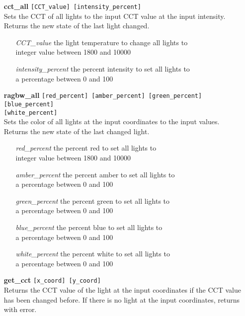 \documentclass[twoside]{article}
\begin{document}
\begin{enumerate}
		\item[\bf cct\_all] \verb|[CCT_value] [intensity_percent]|\\
		Sets the CCT of all lights to the input CCT value at the input intensity.\\
		Returns the new state of the last light changed.
		
		\begin{enumerate}[leftmargin=3\parindent]
			\item[{\it CCT\_value}] the light temperature to change all lights to\\
			integer value between 1800 and 10000
			\item[{\it intensity\_percent}] the percent intensity to set all lights to\\
			a percentage between 0 and 100
		\end{enumerate}
	
		\item[\bf ragbw\_all] \verb|[red_percent] [amber_percent] [green_percent] [blue_percent] |\\
		\verb|[white_percent]|\\
		Sets the color of all lights at the input coordinates to the input values.\\
		Returns the new state of the last changed light.
		
		\begin{enumerate}[leftmargin=3\parindent]
			\item[{\it red\_percent}] the percent red to set all lights to\\
			integer value between 1800 and 10000
			\item[{\it amber\_percent}] the percent amber to set all lights to\\
			a percentage between 0 and 100
			\item[{\it green\_percent}] the percent green to set all lights to\\
			a percentage between 0 and 100
			\item[{\it blue\_percent}] the percent blue to set all lights to\\
			a percentage between 0 and 100
			\item[{\it white\_percent}] the percent white to set all lights to\\
			a percentage between 0 and 100
		\end{enumerate}
		
		\item[\bf get\_cct] \verb|[x_coord] [y_coord]|\\
		Returns the CCT value of the light at the input coordinates if the CCT value has been changed before.
		If there is no light at the input coordinates, returns with error.
		

\end{enumerate}
\end{document}
